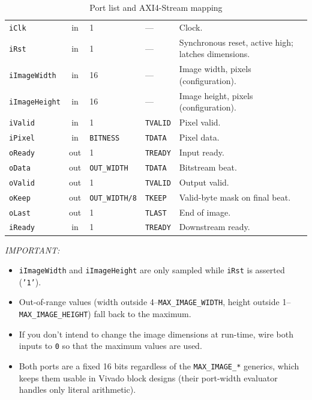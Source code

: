 \documentclass[10pt,a4paper]{article}
\newcommand{\hd}[1]{\leavevmode{\kickerfont\scriptsize\color{muted}\MakeUppercase{#1}}}
\begin{document}
\begin{table}[H]
  \centering
  \caption{Port list and AXI4-Stream mapping}
  \label{tab:ports}
\begin{tabularx}{\textwidth}{@{}l c l l X@{}}
  \toprule
  \hd{Port} & \hd{Dir} & \hd{Width} & \hd{AXIS} & \hd{Role} \\
  \midrule
  \texttt{iClk}        & in  & 1                       & ---             & Clock. \\
  \texttt{iRst}        & in  & 1                       & ---             & Synchronous reset, active high; latches dimensions. \\
  \texttt{iImageWidth} & in  & 16                      & --- & Image width, pixels (configuration). \\
  \texttt{iImageHeight}& in  & 16                      & --- & Image height, pixels (configuration). \\
  \texttt{iValid}      & in  & 1                       & \texttt{TVALID} & Pixel valid. \\
  \texttt{iPixel}      & in  & \texttt{BITNESS}        & \texttt{TDATA}  & Pixel data. \\
  \texttt{oReady}      & out & 1                       & \texttt{TREADY} & Input ready. \\
  \texttt{oData}       & out & \texttt{OUT\_WIDTH}     & \texttt{TDATA}  & Bitstream beat. \\
  \texttt{oValid}      & out & 1                       & \texttt{TVALID} & Output valid. \\
  \texttt{oKeep}       & out & \texttt{OUT\_WIDTH/8}   & \texttt{TKEEP}  & Valid-byte mask on final beat. \\
  \texttt{oLast}       & out & 1                       & \texttt{TLAST}  & End of image. \\
  \texttt{iReady}      & in  & 1                       & \texttt{TREADY} & Downstream ready. \\
  \bottomrule
\end{tabularx}
\end{table}

\noindent \textit{IMPORTANT:}
\begin{itemize}
  \item \texttt{iImageWidth} and \texttt{iImageHeight} are only sampled while \texttt{iRst} is asserted (\texttt{'1'}).
  \item Out-of-range values (width outside 4--\texttt{MAX\_IMAGE\_WIDTH}, height outside 1--\texttt{MAX\_IMAGE\_HEIGHT}) fall back to the maximum.
  \item If you don't intend to change the image dimensions at run-time, wire both inputs to \texttt{0} so that the maximum values are used.
  \item Both ports are a fixed 16 bits regardless of the \texttt{MAX\_IMAGE\_*} generics, which keeps them usable in Vivado block designs (their port-width evaluator handles only literal arithmetic).
\end{itemize}
\end{document}
